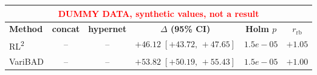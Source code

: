 \begin{tabular}{lccccc}
\hline
\multicolumn{6}{c}{\textcolor{red}{\footnotesize DUMMY DATA, synthetic values, not a result}} \\
\hline
\textbf{Method} & \textbf{concat} & \textbf{hypernet}
 & \textbf{$\Delta$ (95\% CI)} & \textbf{Holm $p$} & \textbf{$r_{\mathrm{rb}}$} \\
\hline
RL\textsuperscript{2} & -- & -- & $+46.12\;[+43.72,\, +47.65]$ & $1.5e-05$ & $+1.05$ \\
VariBAD & -- & -- & $+53.82\;[+50.19,\, +55.43]$ & $1.5e-05$ & $+1.00$ \\
\hline
\end{tabular}
